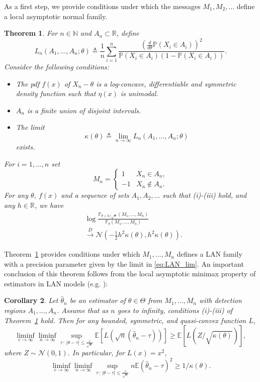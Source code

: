 \documentclass[letterpaper, 11pt]{IEEEtran}      %
\newtheorem{thm}{\bf{Theorem}}
\newtheorem{cor}[thm]{\bf {Corollary}}
\newcommand{\Prob}{\mathbb{P} }
\begin{document}
As a first step, we provide conditions under which the messages $M_1,M_2,\ldots$ define a local asymptotic normal family. 

\begin{thm} \label{thm:LAN1}
For $n \in \mathbb N$ and $A_n \subset \mathbb R$,  define
\begin{equation}
\label{eq:precision_general}
L_n(A_1,\ldots,A_n;\theta) \triangleq \frac{1}{n} \sum_{i=1}^n \frac{ \left(\frac{d}{d \theta} \Prob(X_i \in A_i) \right)^2 }{ \Prob(X_i \in A_i)\left(1- \Prob(X_i \in A_i) \right) }. 
\end{equation}
Consider the following conditions:
\begin{itemize}
\item [(i)\,\,] The pdf $f(x)$ of $X_n-\theta$ is a log-concave, differentiable and symmetric density function such that $\eta(x)$ is unimodal.
\item[(ii)\,] $A_n$ is a finite union of disjoint intervals.
\item[(iii)] The limit 
\begin{equation}
\label{eq:LAN_lim}
\kappa(\theta) \triangleq \lim_{n\to \infty} L_n(A_1,\ldots,A_n; \theta)
\end{equation}
exists. 
\end{itemize}
For $i=1,\ldots,n$ set
\[
M_n = \begin{cases} 1 & X_n \in A_n, \\
-1 & X_n \notin A_n. 
\end{cases} 
\]
For any $\theta$, $f(x)$ and a sequence of sets $A_1,A_2,\ldots$ such that (i)-(iii) hold, and any $h\in \mathbb R$, we have
\begin{align*}
& \log  \frac{ \mathbb P_{\theta+h/\sqrt{n}} (M_1,\ldots,M_n) }{
\mathbb P_{\theta} (M_1,\ldots,M_n)} \\
& \overset{D}{\longrightarrow} \mathcal N\left(-\frac{1}{2} h^2 \kappa(\theta), h^2 \kappa(\theta) \right).
\end{align*} 
\end{thm}
Theorem~\ref{thm:LAN1} provides conditions under which $M_1,\ldots,M_n$ defines a LAN family with a precision parameter given by the limit in \eqref{eq:LAN_lim}. An important conclusion of this theorem follows from the local asymptotic minimax property of estimators in LAN models (e.g. \cite{van2000asymptotic}):
\begin{cor} \label{cor:LA_minimax}
Let $\hat{\theta}_n$ be an estimator of $\theta \in \Theta$ from $M_1,\ldots,M_n$ with detection regions $A_1,\ldots,A_n$. Assume that as $n$ goes to infinity, conditions (i)-(iii) of Theorem~\ref{thm:LAN1} hold. Then for any bounded, symmetric, and quasi-convex function $L$, 
\[
\liminf_{c \to \infty} \liminf_{n \to \infty} \sup_{\tau\,:\,|\theta-\tau| \leq \frac{c}{\sqrt{n} }}  \mathbb E \left[ L\left( \sqrt{n}(\hat{\theta}_{n} - \tau) \right) \right] \geq \mathbb E \left[ L (Z/\sqrt{\kappa(\theta)}) \right],
\]
where $Z \sim \mathcal N(0,1)$. In particular, for $L(x) = x^2$, 
\[
\liminf_{c \to \infty} \liminf_{n \to \infty} \sup_{\tau\,:\,|\theta-\tau| \leq \frac{c}{\sqrt{n} }}  n \mathbb E  \left( \hat{\theta}_{n} - \tau \right)^2 \geq 1/\kappa(\theta).
\]
\end{cor}
\end{document}
